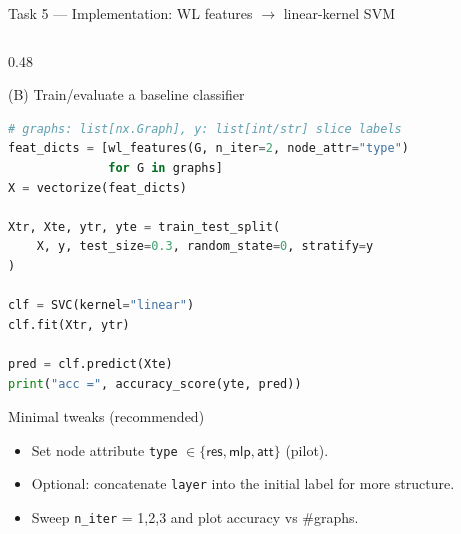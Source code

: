 \documentclass[aspectratio=169,xcolor={dvipsnames}]{beamer}
\begin{document}
\begin{frame}[fragile,shrink=46]{Task 5 — Implementation: WL features $\rightarrow$ linear-kernel SVM}
\begin{columns}[T,onlytextwidth]
\begin{column}{0.48\textwidth}
\begin{block}{(B) Train/evaluate a baseline classifier}
\begin{lstlisting}[language=Python,basicstyle=\ttfamily\scriptsize]
# graphs: list[nx.Graph], y: list[int/str] slice labels
feat_dicts = [wl_features(G, n_iter=2, node_attr="type")
              for G in graphs]
X = vectorize(feat_dicts)

Xtr, Xte, ytr, yte = train_test_split(
    X, y, test_size=0.3, random_state=0, stratify=y
)

clf = SVC(kernel="linear")
clf.fit(Xtr, ytr)

pred = clf.predict(Xte)
print("acc =", accuracy_score(yte, pred))
\end{lstlisting}
\end{block}

\begin{block}{Minimal tweaks (recommended)}
\footnotesize
\begin{itemize}\setlength\itemsep{2pt}
\item Set node attribute \texttt{type} $\in\{\textsf{res},\textsf{mlp},\textsf{att}\}$ (pilot).
\item Optional: concatenate \texttt{layer} into the initial label for more structure.
\item Sweep \texttt{n\_iter} = 1,2,3 and plot accuracy vs \#graphs.
\end{itemize}
\end{block}
\end{column}

\end{columns}
\end{frame}
\end{document}
